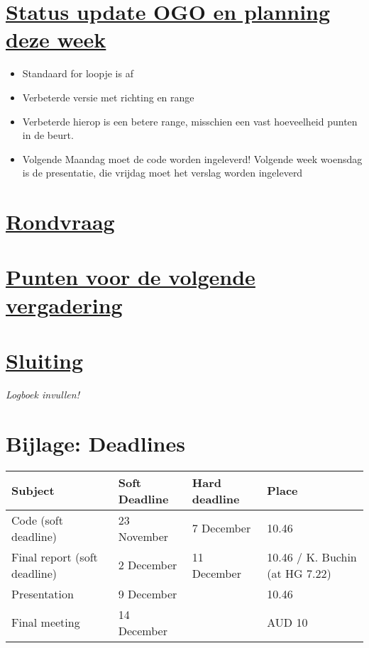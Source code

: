 \documentclass[a4paper]{article}
\begin{document}
\section{\underline{Status update OGO en planning deze week}} %
\label{sec:voortgang_ogo}

\begin{itemize}
  \item Standaard for loopje is af
  \item Verbeterde versie met richting en range
  \item Verbeterde hierop is een betere range, misschien een vast hoeveelheid punten in de beurt.
  \item Volgende Maandag moet de code worden ingeleverd! Volgende week woensdag is de presentatie, die vrijdag moet het verslag worden ingeleverd
\end{itemize}



\section{\underline{Rondvraag}} %
\label{sec:rondvraag}



\section{\underline{Punten voor de volgende vergadering}} %
\label{sec:punten_voor_de_volgende_vergadering}


\section{\underline{Sluiting}} %
\label{sec:sluiting}
\small{\emph{Logboek invullen!}}

\section{Bijlage: Deadlines} %
\label{sec:bijlage_deadlines}

  \begin{tabular}{|p{5cm}|p{3cm}|p{2.5cm}|p{4cm}|}
      \hline
      \textbf{Subject} & \textbf{Soft Deadline} & \textbf{Hard deadline} & \textbf{Place}\\
      \hline
      \hline
      Code (soft deadline) & 23 November & 7 December & 10.46\\
      \hline
      Final report (soft deadline) & 2 December & 11 December & 10.46 / K. Buchin (at HG 7.22)\\
      \hline
      Presentation & 9 December & &10.46\\
      \hline
      Final meeting & 14 December & & AUD 10\\
      \hline
  \end{tabular} \\ \\

\end{document}
